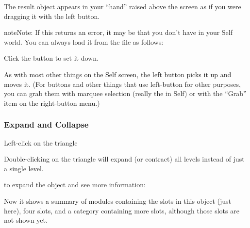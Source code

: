 \documentclass[letterpaper,10pt,english]{sphinxmanual}
\begin{document}
The result object appears in your “hand” raised above the screen as if you were dragging it with the
left button.

\begin{sphinxadmonition}{note}{Note:}
If this returns an error, it may be that you don't have  in your Self world. You can always load it from the file  as follows:

\begin{sphinxVerbatim}[commandchars=\\\{\}]
 
\end{sphinxVerbatim}
\end{sphinxadmonition}

Click the button to set it down.
\begin{figure}[htbp]
\centering

\noindent{}
\end{figure}

As with most other things on the Self screen, the left button picks it up and moves it. (For buttons
and other things that use left-button for other purposes, you can grab them with marquee selection
(really the  in Self) or with the “Grab” item on the right-button menu.)


\subsubsection{Expand and Collapse}
\label{\detokenize{howtoprg:expand-and-collapse}}
Left-click on the triangle %
\begin{footnote}[1]\sphinxAtStartFootnote
Double-clicking on the triangle will expand (or contract) all levels instead of just a single level.
%
\end{footnote} to expand the object and see more information:
\begin{figure}[htbp]
\centering

\noindent{}
\end{figure}

Now it shows a summary of modules containing the slots in this object (just 
here), four slots, and a category containing more slots, although those slots are not shown
yet.
\newpage
\end{document}
